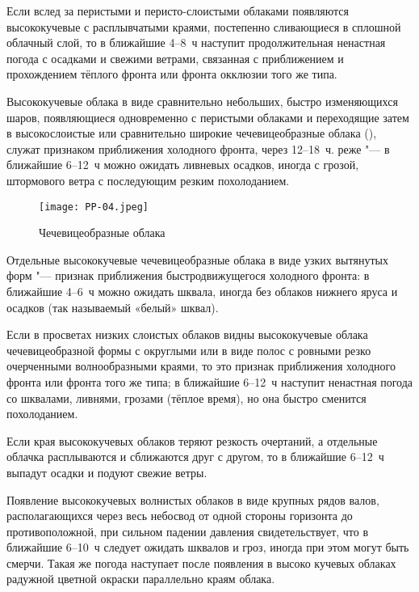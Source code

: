  Если вслед за перистыми и перисто-слоистыми облаками появляются
высококучевые с расплывчатыми краями, постепенно сливающиеся в
сплошной облачный слой, то в ближайшие 4--8~ч наступит
продолжительная ненастная погода с осадками и свежими ветрами,
связанная с приближением и прохождением тёплого фронта или фронта
окклюзии того же типа.

 Высококучевые облака в виде сравнительно небольших, быстро
изменяющихся шаров, появляющиеся одновременно с перистыми облаками и
переходящие затем в высокослоистые или сравнительно широкие
чечевицеобразные облака (), служат признаком приближения
холодного фронта, через 12--18~ч. реже "--- в ближайшие 6--12~ч
можно ожидать ливневых осадков, иногда с грозой, штормового ветра с
последующим резким похолоданием.

\begin{figure}[htb]
  \centering{}
  \texttt{[image: PP-04.jpeg]}
  \caption{Чечевицеобразные облака}
  \label{fig:pp04}
  \small
  \centering{}
\end{figure}

 Отдельные высококучевые чечевицеобразные облака в виде узких
вытянутых форм "--- признак приближения быстродвижущегося холодного
фронта: в ближайшие 4--6~ч можно ожидать шквала, иногда без
облаков нижнего яруса и осадков (так называемый «белый» шквал).

 Если в просветах низких слоистых облаков видны высококучевые
облака чечевицеобразной формы с округлыми или в виде полос с ровными
резко очерченными волнообразными краями, то это признак приближения
холодного фронта или фронта того же типа; в ближайшие 6--12~ч наступит
ненастная погода со шквалами, ливнями, грозами (тёплое время), но она
быстро сменится похолоданием.

 Если края высококучевых облаков теряют резкость очертаний, а
отдельные облачка расплываются и сближаются друг с другом, то в
ближайшие 6--12~ч выпадут осадки и подуют свежие ветры.

 Появление высококучевых волнистых облаков в виде крупных рядов
валов, располагающихся через весь небосвод от одной стороны горизонта
до противоположной, при сильном падении давления свидетельствует, что
в ближайшие 6--10~ч следует ожидать шквалов и гроз, иногда при этом
могут быть смерчи. Такая же погода наступает после появления в высоко
кучевых облаках радужной цветной окраски параллельно краям облака.

